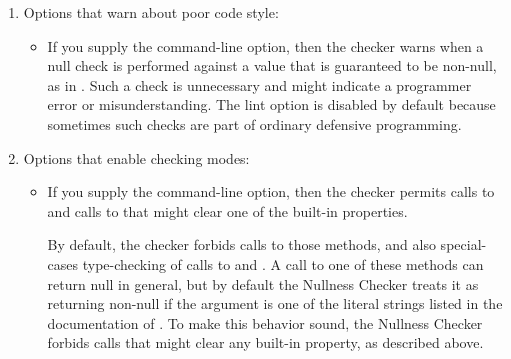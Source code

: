\begin{enumerate}
\begin{itemize}
\item
  \label{nullness-AcheckEnclosingExpr}%
  If you supply the  command-line option, the soundness of
  the Nullness Initialization Checker is improved. In previous versions and without supplying the new flag,
  the uninitialized enclosing expression of an inner class instantiation cannot be detected, which is unsound.
  However, this option is by default disabled since it is strict and will result in many false positives.
  Use this flag to soundly handle the nullness of the enclosing expression for the inner class instantiation.
\end{itemize}

\item
  Options that warn about poor code style:

\begin{itemize}
\item
  \label{nullness-lint-nulltest}%
  If you supply the  command-line option, then the
  checker warns when a null check is performed against a value that is
  guaranteed to be non-null, as in .  Such a check is
  unnecessary and might indicate a programmer error or misunderstanding.
  The lint option is disabled by default because sometimes such checks are
  part of ordinary defensive programming.
\end{itemize}

\item
  Options that enable checking modes:

\begin{itemize}
\item
  If you supply the  command-line option,
  then the checker permits calls to
  and calls to
  that might clear one of the built-in properties.
  
  By default, the checker forbids calls to those methods, and also
  special-cases type-checking of calls to
  and
  .
  A call to one of these methods
  can return null in general, but by default the Nullness Checker treats it
  as returning non-null if the argument is one of the literal strings
  listed in the documentation of
  .
  To make this behavior sound, the Nullness Checker forbids calls that
  might clear any built-in property, as described above.


\end{itemize}
\end{enumerate}
